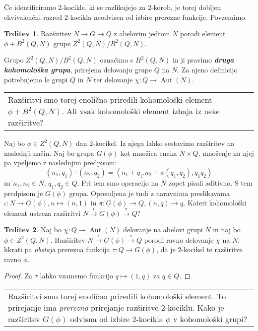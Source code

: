 \documentclass[11pt]{book}
\DeclareMathOperator\Aut{Aut}
\def\definicija{\color{rdeca}\bf\em}
\def\vprasanje{\color{oranzna}}
\theoremstyle{definition}
\theoremstyle{zgled}
\theoremstyle{odprtproblem}
\theoremstyle{domacanaloga}
\newenvironment{dokaz}
    {\color{siva}\begin{proof}}
    {\end{proof}}
\theoremstyle{izrek}
\newtheorem*{trditev}{Trditev}
\newenvironment{povzetek}
    {
\smallskip
\begin{center}
\color{svetlosiva}
\begin{tabular}{|p{0.7\textwidth}}
    }
    {
\end{tabular}
\end{center}
\smallskip
    }
\begin{document}
Če identificiramo $2$-kocikle, ki se razlikujejo za $2$-korob, je torej dobljen ekvivalenčni razred $2$-kocikla neodvisen od izbire prerezne funkcije. Povzemimo.

\begin{trditev}
Razširitev $N \to G \to Q$ z abelovim jedrom $N$ porodi element $\phi + B^2(Q,N)$ grupe $Z^2(Q,N)/B^2(Q,N)$.
\end{trditev}

Grupo $Z^2(Q,N)/B^2(Q,N)$ označimo s {\definicija $H^2(Q,N)$} in ji pravimo {\definicija druga kohomološka grupa}, prirejena delovanju grupe $Q$ na $N$. Za njeno definicijo potrebujemo le grupi $Q$ in $N$ ter delovanje $\chi \colon Q \to \Aut(N)$.

\begin{povzetek}
Razširitvi smo torej enolično priredili kohomološki element $\phi + B^2(Q,N)$. {\vprasanje Ali vsak kohomološki element izhaja iz neke razširitve?}
\end{povzetek}

Naj bo $\phi \in Z^2(Q,N)$ dan $2$-kocikel. Iz njega lahko sestavimo razširitev na naslednji način. Naj bo grupa $G(\phi)$ kot množica enaka $N \times Q$, množenje na njej pa vpeljemo z naslednjim predpisom:
\[
(n_1, q_1) \cdot (n_2, q_2) = (n_1 + q_1.n_2 + \phi(q_1, q_2), q_1 q_2)
\]
za $n_1, n_2 \in N$, $q_1, q_2 \in Q$. Pri tem smo operacijo na $N$ zopet pisali aditivno. S tem predpisom je $G(\phi)$ grupa. Opremljena je tudi z naravnima preslikavama $\iota \colon N \to G(\phi), n \mapsto (n,1)$ in $\pi \colon G(\phi) \to Q, (n,q) \mapsto q$. {\vprasanje Kateri kohomološki element ustreza razširitvi $N \xrightarrow{\iota} G(\phi) \xrightarrow{\pi} Q$?}

\begin{trditev}
Naj bo $\chi \colon Q \to \Aut(N)$ delovanje na abelovi grupi $N$ in naj bo $\phi \in Z^2(Q,N)$. Razširitev $N \xrightarrow{\iota} G(\phi) \xrightarrow{\pi} Q$ porodi ravno delovanje $\chi$ na $N$, hkrati pa {\em obstaja} prerezna funkcija $\tau \colon Q \to G(\phi)$, da je $2$-kocikel te razširitve ravno $\phi$.
\end{trditev}

\begin{dokaz}
Za $\tau$ lahko vzamemo funkcijo $q \mapsto (1,q)$ za $q \in Q$.
\end{dokaz}

\begin{povzetek}
Razširitvi smo torej enolično priredili kohomološki element. To prirejanje ima {\em prerezno} prirejanje razširitve $2$-kociklu. {\vprasanje Kako je razširitev $G(\phi)$ odvisna od izbire $2$-kocikla $\phi$ v kohomološki grupi?}
\end{povzetek}
\end{document}
